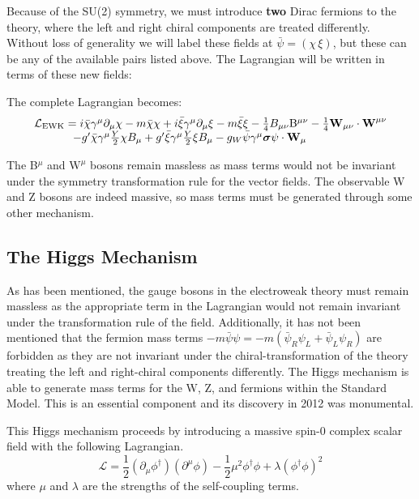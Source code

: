 Because of the SU(2) symmetry, we must introduce \textbf{two} Dirac fermions to the theory, where the left and right chiral components are treated differently. Without loss of generality we will label these fields at $\bar{\psi} = (\chi \, \xi)$, but these can be any of the available pairs listed above. The Lagrangian will be written in terms of these new fields:

The complete Lagrangian becomes:
\begin{equation}
\begin{array}{l}
\mathcal{L}_{\mathrm{EWK}} = 
i \bar{\chi} \gamma^{\mu} \partial_{\mu} \chi - m \bar{\chi} \chi
+ i \bar{\xi}   \gamma^{\mu}    \partial_{\mu} \xi  - m \bar{\xi} \xi
- \frac{1}{4}\mathrm{}B_{\mu\nu}\mathrm{B}^{\mu\nu}
-\frac{1}{4}\bm{\mathrm{W}}_{\mu\nu} \cdot \bm{\mathrm{W}}^{\mu\nu} \\
\hspace{1.2cm}
-  g' \bar{\chi} \gamma^{\mu} \frac{Y}{2} \chi B_{\mu} + g' \bar{\xi} \gamma^{\mu} \frac{Y}{2} \xi B_{\mu}
- g_W  \bar{\psi} \gamma^{\mu} \bm{\sigma} \psi \cdot \bm{\mathrm{W}}_{\mu}
\end{array}
\end{equation}

The B$^{\mu}$ and $\bm{\mathrm{W}}^{\mu}$ bosons remain massless as mass terms would not be invariant under the symmetry transformation rule for the vector fields. The observable W and Z bosons are indeed massive, so mass terms must be generated through some other mechanism.

\subsection{The Higgs Mechanism}

As has been mentioned, the gauge bosons in the electroweak theory must remain massless as the appropriate term in the Lagrangian would not remain invariant under the transformation rule of the field. Additionally, it has not been mentioned that the fermion mass terms $-m\bar{\psi}\psi = -m( \bar{\psi}_{R} \psi_{L} + \bar{\psi}_{L}\psi_{R})$ are forbidden as they are not invariant under the chiral-transformation of the theory treating the left and right-chiral components differently. The Higgs mechanism is able to generate mass terms for the W, Z, and fermions within the Standard Model. This is an essential component and its discovery in 2012 was monumental. \cite{higgsdisc}

This Higgs mechanism proceeds by introducing a massive spin-0 complex scalar field with the following Lagrangian.
\begin{equation}
\mathcal{L} = \frac{1}{2} (\partial_{\mu}\phi^{\dagger})(\partial^{\mu}\phi) - \frac{1}{2}\mu^{2} \phi^{\dagger}\phi + \lambda(\phi^{\dagger}\phi)^{2}
\end{equation}
where $\mu$ and $\lambda$ are the strengths of the self-coupling terms.

